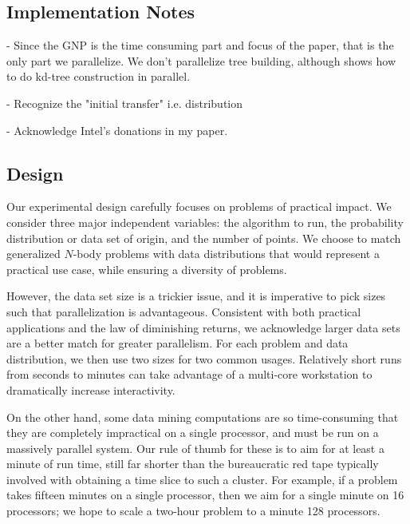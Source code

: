 \documentclass[twoside,leqno,twocolumn]{article}
\begin{document}
\subsection{Implementation Notes}

- Since the GNP is the time consuming part and focus of the paper, that is the only part we parallelize.
We don't parallelize tree building, although \cite{xyz} shows how to do kd-tree construction in parallel.

- Recognize the "initial transfer" i.e. distribution

- Acknowledge Intel's donations in my paper.

\subsection{Design}


Our experimental design carefully focuses on problems of practical impact.
We consider three major independent variables: the algorithm to run, the probability distribution or data set of origin, and the number of points.
We choose to match generalized $N$-body problems with data distributions that would represent a practical use case, while ensuring a diversity of problems.

However, the data set size is a trickier issue, and it is imperative to pick sizes such that parallelization is advantageous.
Consistent with both practical applications and the law of diminishing returns, we acknowledge larger data sets are a better match for greater parallelism.
For each problem and data distribution, we then use two sizes for two common usages.
Relatively short runs from seconds to minutes can take advantage of a multi-core workstation to dramatically increase interactivity.

On the other hand, some data mining computations are so time-consuming that they are completely impractical on a single processor, and must be run on a massively parallel system.
Our rule of thumb for these is to aim for at least a minute of run time, still far shorter than the bureaucratic red tape typically involved with obtaining a time slice to such a cluster.
For example, if a problem takes fifteen minutes on a single processor, then we aim for a single minute on 16 processors; we hope to scale a two-hour problem to a minute 128 processors.
\end{document}
